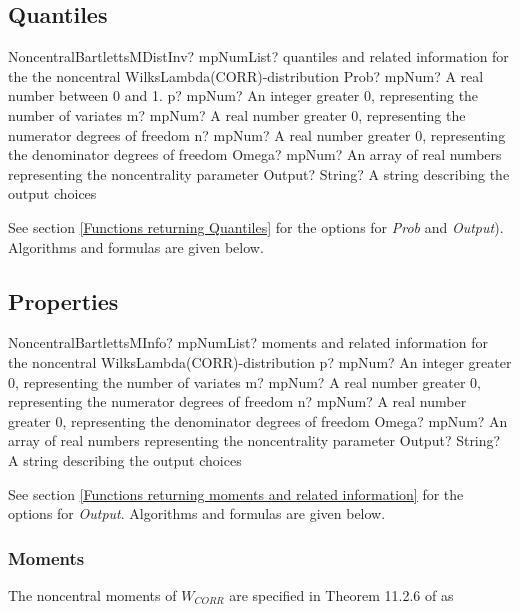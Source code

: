 \subsection{Quantiles}

\begin{mpFunctionsExtract}
	\mpFunctionSixNotImplemented
	{NoncentralBartlettsMDistInv? mpNumList? quantiles and related information for the the noncentral WilksLambda(CORR)-distribution}
	{Prob? mpNum? A real number between 0 and 1.}
	{p? mpNum? An integer greater 0, representing the number of variates}
	{m? mpNum? A real number greater 0, representing the numerator  degrees of freedom}
	{n? mpNum? A real number greater 0, representing the denominator degrees of freedom}
	{Omega? mpNum? An array of real numbers representing the noncentrality parameter}
	{Output? String? A string describing the output choices}
\end{mpFunctionsExtract}

See section \ref{Functions returning Quantiles} for the options for  {\itshape\sffamily Prob} and {\itshape\sffamily Output}). Algorithms and formulas are given below.







\subsection{Properties}

\begin{mpFunctionsExtract}
	\mpFunctionFiveNotImplemented
	{NoncentralBartlettsMInfo? mpNumList? moments and related information for the noncentral WilksLambda(CORR)-distribution}
	{p? mpNum? An integer greater 0, representing the number of variates}
	{m? mpNum? A real number greater 0, representing the numerator  degrees of freedom}
	{n? mpNum? A real number greater 0, representing the denominator degrees of freedom}
	{Omega? mpNum? An array of real numbers representing the noncentrality parameter}
	{Output? String? A string describing the output choices}
\end{mpFunctionsExtract}

\vspace{0.3cm}
See section \ref{Functions returning moments and related information} for the options for {\itshape\sffamily Output}. Algorithms and formulas are given below.


\subsubsection{Moments}
The noncentral moments of $W_{CORR}$ are specified in Theorem 11.2.6 of \cite{Muirhead_1982} as

